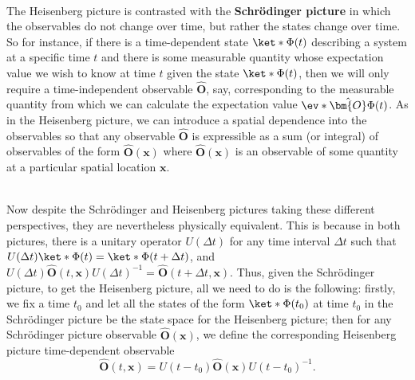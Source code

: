 \documentclass[12pt]{report}
\begin{document}
\strut \\[\baselineskip]
The Heisenberg picture is contrasted with the \textbf{Schr\"{o}dinger picture} in which the observables do not change over time, but rather the states change over time. So for instance, if there is a time-dependent state $\ket*{\Phi(t)}$  %
%
 describing a system at a specific time $t$ and there is some measurable quantity whose expectation value we wish to know at time $t$ given the state $\ket*{\Phi(t)}$, then we will only require a time-independent observable $\hat{\bm{O}}$, %
  say, corresponding to the measurable quantity from which we can calculate the expectation value $\ev*{\hat{\bm{O}}}{\Phi(t)}$. As in the Heisenberg picture, we can introduce a spatial dependence into the observables so that any observable  $\hat{\bm{O}}$ is expressible as a sum (or integral) of observables of the form $\hat{\bm{O}}(\bm{x})$  %
  where $\hat{\bm{O}}(\bm{x})$ is an observable of some quantity at a particular spatial location $\bm{x}$.
\strut \\[\baselineskip] 
Now despite the Schr\"{o}dinger and Heisenberg pictures taking these different perspectives, they are nevertheless physically equivalent. This is because in both pictures, there is a unitary operator $U(\Delta t)$  %
%
for any time interval $\Delta t$ such that $U(\Delta t)\ket*{\Phi(t)}=\ket*{\Phi(t+\Delta t)}$, and $U(\Delta t)\hat{\bm{O}}(t, \bm{x})U(\Delta t)^{-1}=\hat{\bm{O}}(t+\Delta t, \bm{x})$. Thus, given the Schr\"{o}dinger picture, to get the Heisenberg picture, all we need to do is the following: firstly, we fix a time $t_0$ and let all the states of the form $\ket*{\Phi(t_0)}$ at time $t_0$ in the Schr\"{o}dinger picture be the state space for the Heisenberg picture; then for any Schr\"{o}dinger picture observable $\hat{\bm{O}}(\bm{x})$, we define the corresponding Heisenberg picture time-dependent observable 
$$\hat{\bm{O}}(t, \bm{x})=U(t-t_0)\hat{\bm{O}}(\bm{x})U(t-t_0)^{-1}.$$ 
\end{document}
